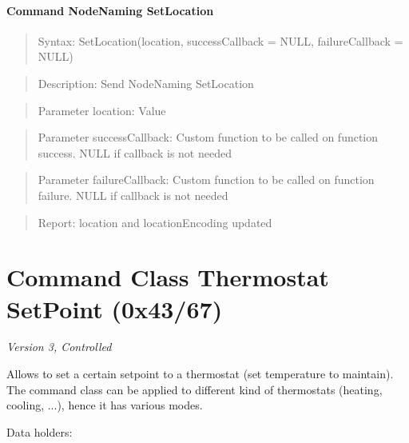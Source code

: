 \paragraph{Command NodeNaming SetLocation}
\begin{quote}Syntax: SetLocation(location, successCallback = NULL, failureCallback = NULL)\end{quote}
\begin{quote}Description: Send NodeNaming SetLocation\end{quote}
\begin{quote}Parameter location: Value\end{quote}
\begin{quote}Parameter successCallback: Custom function to be called on function success. NULL if callback is not needed\end{quote}
\begin{quote}Parameter failureCallback: Custom function to be called on function failure. NULL if callback is not needed\end{quote}
\begin{quote}Report: location and locationEncoding updated\end{quote}


\section{Command Class Thermostat SetPoint (0x43/67)}

\textit{Version 3, Controlled}
\newline

Allows to set a certain setpoint to a thermostat (set temperature to maintain). The command class can be applied to different kind of thermostats (heating, cooling, ...), hence it has various modes.
\newline

\noindent
Data holders:

